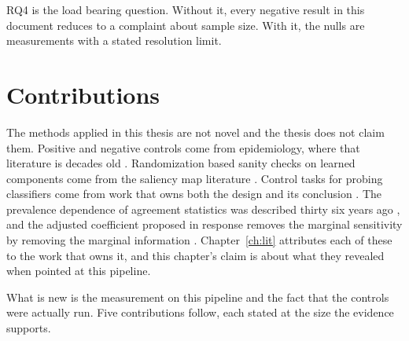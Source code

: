 RQ4 is the load bearing question. Without it, every negative result in this
document reduces to a complaint about sample size. With it, the nulls are
measurements with a stated resolution limit.

\section{Contributions}
\label{sec:intro-contributions}

The methods applied in this thesis are not novel and the thesis does not claim
them. Positive and negative controls come from epidemiology, where that
literature is decades old \citep{lipsitch2010negative}. Randomization based
sanity checks on learned components come from the saliency map literature
\citep{adebayo2018sanity}. Control tasks for probing classifiers come from work
that owns both the design and its conclusion \citep{hewitt2019control}. The
prevalence dependence of agreement statistics was described thirty six years ago
\citep{feinstein1990paradoxes,cicchetti1990resolving}, and the adjusted
coefficient proposed in response removes the marginal sensitivity by removing
the marginal information \citep{byrt1993pabak}.
Chapter~\ref{ch:lit} attributes each of these to the work that owns it, and
this chapter's claim is about what they revealed when pointed at this pipeline.

What is new is the measurement on this pipeline and the fact that the controls
were actually run. Five contributions follow, each stated at the size the
evidence supports.

